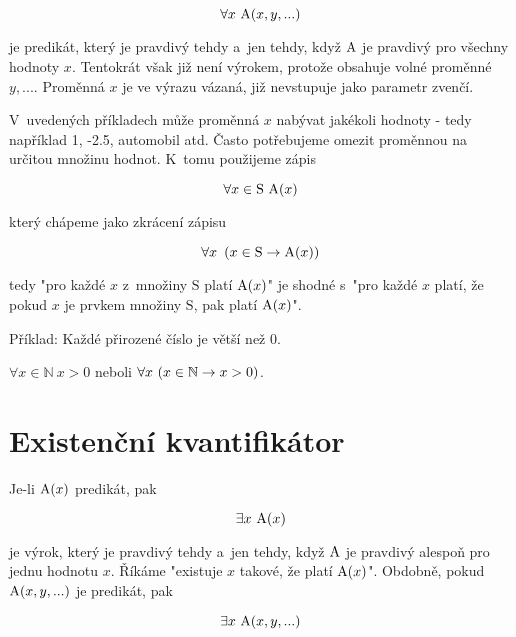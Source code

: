 \begin{equation}
\forall x \ \mathrm{A}(x, y, ...)
\end{equation}

je predikát, který je pravdivý tehdy a~jen tehdy, když \(\mathrm{A}\) je pravdivý pro všechny hodnoty \(x\). Tentokrát však již není výrokem, protože obsahuje volné proměnné \(y, ...\). Proměnná \(x\) je ve výrazu vázaná, již nevstupuje jako parametr zvenčí.

V~uvedených příkladech může proměnná \(x\) nabývat jakékoli hodnoty - tedy například 1, -2.5, automobil atd. Často potřebujeme omezit proměnnou na určitou množinu hodnot. K~tomu použijeme zápis

\begin{equation}
\forall x \in \mathrm{S} \ \predicate{A}(x)
\end{equation}

který chápeme jako zkrácení zápisu

\begin{equation}
\forall x \ \left( x \in \mathrm{S} \rightarrow \mathrm{A}(x) \right)
\end{equation}

tedy "pro každé \(x\) z~množiny \(\mathrm{S}\) platí \(\mathrm{A}(x)\)" je shodné s~"pro každé \(x\) platí, že pokud \(x\) je prvkem množiny \(\mathrm{S}\), pak platí \(\mathrm{A}(x)\)".

Příklad: Každé přirozené číslo je větší než 0. 

\(\forall x \in \mathbb{N} \ x > 0\) neboli \(\forall x \ (x \in \mathbb{N} \rightarrow x > 0)\).


\section{Existenční kvantifikátor}

Je-li \(\mathrm{A}(x)\) predikát, pak

\begin{equation}
\exists x \ \predicate{A}(x)
\end{equation}

je výrok, který je pravdivý tehdy a~jen tehdy, když \(\mathrm{A}\) je pravdivý alespoň pro jednu hodnotu \(x\). Říkáme "existuje \(x\) takové, že platí \(\mathrm{A}(x)\)". Obdobně, pokud \(\mathrm{A}(x, y, ...)\) je predikát, pak

\begin{equation}
\exists x \ \mathrm{A}(x, y, ...)
\end{equation}

